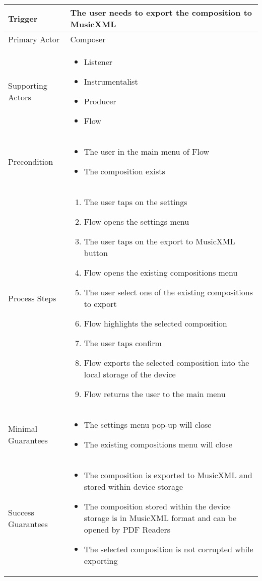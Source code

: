 \begin{longtable}{|X|X|}
\hline
Trigger & 
The user needs to export the composition to MusicXML\\
\hline
Primary Actor & 
Composer \\
\hline
Supporting Actors & 
\begin{itemize}
\item Listener
\item Instrumentalist
\item Producer
\item Flow
\end{itemize} \\
\hline
Precondition & 
\begin{itemize}
\item The user in the main menu of Flow
\item The composition exists
\end{itemize} \\
\hline
Process Steps & 
\begin{enumerate}
\item The user taps on the settings
\item Flow opens the settings menu
\item The user taps on the export to MusicXML button
\item Flow opens the existing compositions menu
\item The user select one of the existing compositions to export
\item Flow highlights the selected composition
\item The user taps confirm
\item Flow exports the selected composition into the local storage of the device
\item Flow returns the user to the main menu
\end{enumerate} \\
\hline
Minimal Guarantees & 
\begin{itemize}
	\item The settings menu pop-up will close 
	\item The existing compositions menu will close
\end{itemize} \\
\hline
Success Guarantees & 
\begin{itemize}
	\item The composition is exported to MusicXML and stored within device storage
	\item The composition stored within the device storage is in MusicXML format and can be opened by PDF Readers
	\item The selected composition is not corrupted while exporting
\end{itemize} \\
\hline
\end{longtable}